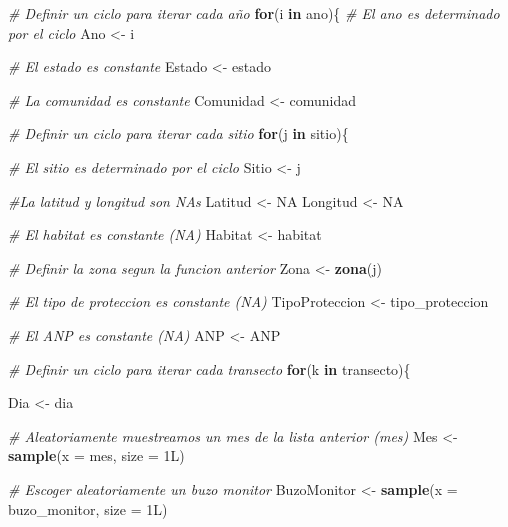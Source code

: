 \documentclass[]{krantz}
\newenvironment{Shaded}{\begin{snugshade}}{\end{snugshade}}
\newcommand{\CommentTok}[1]{\textcolor[rgb]{0.56,0.35,0.01}{\textit{#1}}}
\newcommand{\ControlFlowTok}[1]{\textcolor[rgb]{0.13,0.29,0.53}{\textbf{#1}}}
\newcommand{\DataTypeTok}[1]{\textcolor[rgb]{0.13,0.29,0.53}{#1}}
\newcommand{\KeywordTok}[1]{\textcolor[rgb]{0.13,0.29,0.53}{\textbf{#1}}}
\newcommand{\NormalTok}[1]{#1}
\newcommand{\OtherTok}[1]{\textcolor[rgb]{0.56,0.35,0.01}{#1}}
\newcommand{\StringTok}[1]{\textcolor[rgb]{0.31,0.60,0.02}{#1}}
\begin{document}
\begin{Shaded}
\begin{Highlighting}[]
\CommentTok{# Definir un ciclo para iterar cada año}
\ControlFlowTok{for}\NormalTok{(i }\ControlFlowTok{in}\NormalTok{ ano)\{}
  \CommentTok{# El ano es determinado por el ciclo}
\NormalTok{  Ano <-}\StringTok{ }\NormalTok{i}
  
  \CommentTok{# El estado es constante}
\NormalTok{  Estado <-}\StringTok{ }\NormalTok{estado}
  
  \CommentTok{# La comunidad es constante}
\NormalTok{  Comunidad <-}\StringTok{ }\NormalTok{comunidad}
  
  \CommentTok{# Definir un ciclo para iterar cada sitio}
  \ControlFlowTok{for}\NormalTok{(j }\ControlFlowTok{in}\NormalTok{ sitio)\{}
    
    \CommentTok{# El sitio es determinado por el ciclo}
\NormalTok{    Sitio <-}\StringTok{ }\NormalTok{j}
    
    \CommentTok{#La latitud y longitud son NAs}
\NormalTok{    Latitud <-}\StringTok{ }\OtherTok{NA}
\NormalTok{    Longitud <-}\StringTok{ }\OtherTok{NA}
    
    \CommentTok{# El habitat es constante (NA)}
\NormalTok{    Habitat <-}\StringTok{ }\NormalTok{habitat}
    
    \CommentTok{# Definir la zona segun la funcion anterior}
\NormalTok{    Zona <-}\StringTok{ }\KeywordTok{zona}\NormalTok{(j)}
    
    \CommentTok{# El tipo de proteccion es constante (NA)}
\NormalTok{    TipoProteccion <-}\StringTok{ }\NormalTok{tipo_proteccion}
    
    \CommentTok{# El ANP es constante (NA)}
\NormalTok{    ANP <-}\StringTok{ }\NormalTok{ANP}
    
    \CommentTok{# Definir un ciclo para iterar cada transecto}
    \ControlFlowTok{for}\NormalTok{(k }\ControlFlowTok{in}\NormalTok{ transecto)\{}
      
\NormalTok{      Dia <-}\StringTok{ }\NormalTok{dia}
      
      \CommentTok{# Aleatoriamente muestreamos un mes de la lista anterior (mes)}
\NormalTok{      Mes <-}\StringTok{ }\KeywordTok{sample}\NormalTok{(}\DataTypeTok{x =}\NormalTok{ mes,}
                    \DataTypeTok{size =}\NormalTok{ 1L)}
      
      \CommentTok{# Escoger aleatoriamente un buzo monitor}
\NormalTok{      BuzoMonitor <-}\StringTok{ }\KeywordTok{sample}\NormalTok{(}\DataTypeTok{x =}\NormalTok{ buzo_monitor,}
                            \DataTypeTok{size =}\NormalTok{ 1L)}
      

\end{Highlighting}
\end{Shaded}
\end{document}

